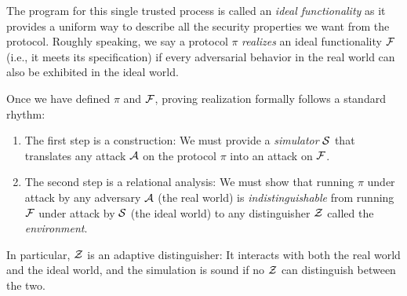 The program for this single trusted process is called an \emph{ideal
  functionality} as it provides a uniform way to describe all the security
properties we want from the protocol. Roughly speaking, we say a protocol
$\pi$ \emph{realizes} an ideal functionality $\mathcal{{F}}$ (i.e., it meets its
specification) if every adversarial behavior in the real world can also be
exhibited in the ideal world.

Once we have defined $\pi$ and $\mathcal{{F}}$, proving realization formally
follows a standard rhythm:
\begin{enumerate}[leftmargin=*]
\item The first step is a construction: We must provide a \emph{simulator}
  $\mathcal{{S}}$ that translates any attack $\mathcal{{A}}$ on the protocol $\pi$ into
  an attack on $\mathcal{{F}}$.
\item The second step is a relational analysis: We must show that running $\pi$
  under attack by any adversary $\mathcal{{A}}$ (the real world) is
  \emph{indistinguishable} from running $\mathcal{{F}}$ under attack by $\mathcal{{S}}$ (the
  ideal world) to any distinguisher $\mathcal{{Z}}$ called the \emph{environment}.
\end{enumerate}
In particular, $\mathcal{{Z}}$ is an adaptive distinguisher: It interacts with both the
real world and the ideal world, and the simulation is sound if no $\mathcal{{Z}}$ can
distinguish between the two.

